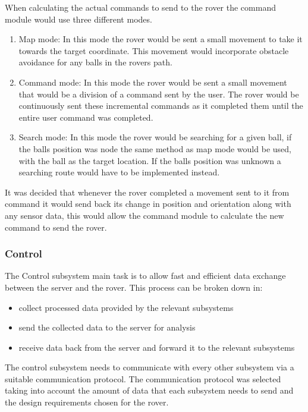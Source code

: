 \documentclass[10pt,twoside]{article}
\begin{document}
\smallbreak
When calculating the actual commands to send to the rover the command module would use three different modes.
\begin{enumerate}
  \item Map mode: In this mode the rover would be sent a small movement to take it towards the target coordinate. This movement would incorporate obstacle avoidance for any balls in the rovers path.
  \item Command mode: In this mode the rover would be sent a small movement that would be a division of a command sent by the user. The rover would be continuously sent these incremental commands as it completed them until the entire user command was completed.
  \item Search mode: In this mode the rover would be searching for a given ball, if the balls position was node the same method as map mode would be used, with the ball as the target location. If the balls position was unknown a searching route would have to be implemented instead.
\end{enumerate}
It was decided that whenever the rover completed a movement sent to it from command it would send back its change in position and orientation along with any sensor data, this would allow the command module to calculate the new command to send the rover.


\subsubsection{Control}

The Control subsystem main task is to allow fast and efficient data exchange between the server and the rover. This process can be broken down in:
\begin{itemize}
    \item collect processed data provided by the relevant subsystems
    \item send the collected data to the server for analysis
    \item receive data back from the server and forward it to the relevant subsystems
\end{itemize}

The control subsystem needs to communicate with every other subsystem via a suitable communication protocol. The communication protocol was selected taking into account the amount of data that each subsystem needs to send and the design requirements chosen for the rover. %
\end{document}
